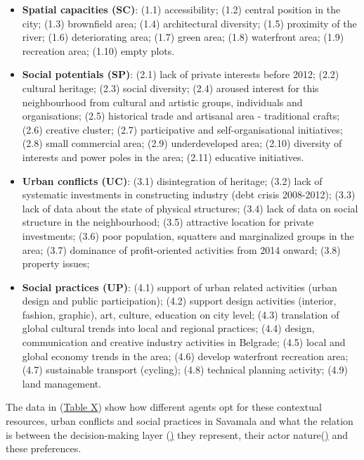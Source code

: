 \documentclass[11pt]{report}
\begin{document}
\begin{itemize}

\item \textbf{Spatial capacities (SC)}: 
(1.1) accessibility;
(1.2) central position in the city;
(1.3) brownfield area;
(1.4) architectural diversity;
(1.5) proximity of the river;
(1.6) deteriorating area;
(1.7) green area;
(1.8) waterfront area;
(1.9) recreation area;
(1.10) empty plots.

\item \textbf{Social potentials (SP)}:
(2.1) lack of private interests before 2012;
(2.2) cultural heritage;
(2.3) social diversity;
(2.4) aroused interest for this neighbourhood from cultural and artistic groups, individuals and organisations;
(2.5) historical trade and artisanal area - traditional crafts;
(2.6) creative cluster;
(2.7) participative and self-organisational initiatives;
(2.8) small commercial area;
(2.9) underdeveloped area;
(2.10) diversity of interests and power poles in the area;
(2.11) educative initiatives.

\item \textbf{Urban conflicts (UC)}:
(3.1) disintegration of heritage;
(3.2) lack of systematic investments in constructing industry (debt crisis 2008-2012);
(3.3) lack of data about the state of physical structures;
(3.4) lack of data on social structure in the neighbourhood;
(3.5) attractive location for private investments;
(3.6) poor population, squatters and marginalized groups in the area;
(3.7) dominance of profit-oriented activities from 2014 onward;
(3.8) property issues;

\item \textbf{Social practices (UP)}:
(4.1) support of urban related activities (urban design and public participation);
(4.2) support design activities (interior, fashion, graphic), art, culture, education on city level;
(4.3) translation of global cultural trends into local and regional practices;
(4.4) design, communication and creative industry activities in Belgrade;
(4.5) local and global economy trends in the area;
(4.6) develop waterfront recreation area;
(4.7) sustainable transport (cycling);
(4.8) technical planning activity;
(4.9) land management.
\end{itemize}

The data in (\href{Table 1}{Table X}) show how different agents opt for these contextual resources, urban conflicts and social practices in Savamala and what the relation is between the decision-making layer (\href{Section 4.2}\href{Section 4.2}) they represent, their actor nature(\href{Section 5.1}\href{Section 5.1}) and these preferences. 
\end{document}
